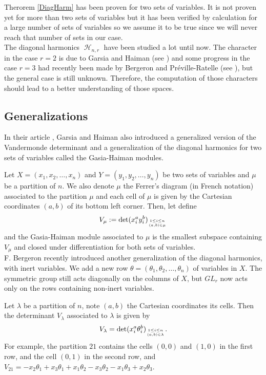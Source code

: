 \documentclass[letter,12pt]{article}
\DeclareMathOperator{\harmonics}{\mathcal{H}}
\begin{document}
	Therorem \ref{DiagHarm} has been proven for two sets of variables. It is not proven yet for more than two sets of variables but it has been verified by calculation for a large number of sets of variables so we assume it to be true since we will never reach that number of sets in our case.  \\
	
	The diagonal harmonics $\harmonics_{n,r}$ have been studied a lot until now. The character in the case $r=2$ is due to Garsia and Haiman (see \cite{GarsiaHaiman1993}) and some progress in the case $r=3$ had recently been made by Bergeron and Préville-Ratelle (see \cite{BergeronPreville2012}), but the general case is still unknown. Therefore, the computation of those characters should lead to a better understanding of those spaces. 
	
	\subsection{Generalizations}
	
	In their article \cite{GarsiaHaiman1993}, Garsia and Haiman also introduced a generalized version of the Vandermonde determinant and a generalization of the diagonal harmonics for two sets of variables called the Gasia-Haiman modules. 
	
	Let $X=(x_1, x_2, \dots, x_n)$ and $Y=(y_1, y_2, \dots, y_n)$ be two sets of variables and $\mu$ be a partition of $n$. We also denote $\mu$ the Ferrer's diagram (in French notation) associated to the partition $\mu$ and each cell of $\mu$ is given by the Cartesian coordinates $(a,b)$ of its bottom left corner. Then, let define
	$$V_{\mu} := \det (x_i^ ay_i^ b)_{1 \leq i \leq n \atop (a,b) \in \mu}$$
	and the Gasia-Haiman module associated to $\mu$ is the smallest subspace containing $V_{\mu}$ and closed under differentiation for both sets of variables. \\
	
	F. Bergeron recently introduced another generalization of the diagonal harmonics, with inert variables. We add a new row $\theta = (\theta_1, \theta_2, \dots, \theta_n)$ of variables in $X$. The symmetric group still acts diagonally on the columns of $X$, but $GL_r$ now acts only on the rows containing non-inert variables. 
		 
	Let $\lambda$ be a partition of $n$, note $(a,b)$ the Cartesian coordinates its cells. Then the determinant $V_{\lambda}$ associated to $\lambda$ is given by $$V_{\lambda} = \det (x_i^a \theta_i^b)_{1 \leq i \leq n \atop (a,b) \in \lambda} .$$
	For example, the partition $21$ contains the cells $(0,0)$ and $(1,0)$ in the first row, and the cell $(0,1)$ in the second row, and $V_{21} = -x_2\theta_1 + x_3\theta_1 + x_1\theta_2 - x_3\theta_2 - x_1\theta_3 + x_2\theta_3$. 
	
\end{document}
